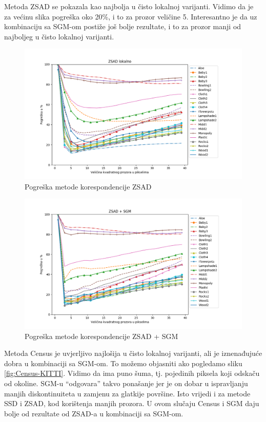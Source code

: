 \documentclass[utf8, zavrsni, numeric]{fer}
\begin{document}
Metoda ZSAD se pokazala kao najbolja u čisto lokalnoj varijanti. Vidimo da je
za većinu slika pogreška oko 20\%, i to za prozor veličine 5. Interesantno je da
uz kombinaciju sa SGM-om postiže još bolje rezultate, i to za prozor manji od
najboljeg u čisto lokalnoj varijanti.

\begin{figure}[H]
  \centering
  \includegraphics[width=13cm]{img/ZSAD_lokalno_middlebury.png}
  \caption{Pogreška metode korespondencije ZSAD}
  \label{fig:ZSAD-error}
\end{figure}

\begin{figure}[H]
  \centering
  \includegraphics[width=13cm]{img/ZSAD_sgm_middlebury.png}
  \caption{Pogreška metode korespondencije ZSAD + SGM}
  \label{fig:ZSAD-sgm-error}
\end{figure}

Metoda Census je uvjerljivo najlošija u čisto lokalnoj varijanti, ali je iznenađujuće dobra
u kombinaciji sa SGM-om. To možemo objasniti ako pogledamo sliku \ref{fig:Census-KITTI}.
Vidimo da ima puno šuma, tj. pojedinih piksela koji odskaču od okoline. SGM-u ``odgovara''
takvo ponašanje jer je on dobar u ispravljanju manjih diskontinuiteta u zamjenu za glatkije
površine. Isto vrijedi i za metode SSD i ZSAD, kod korištenja manjih prozora. U ovom
slučaju Census i SGM daju bolje od rezultate od ZSAD-a u kombinaciji sa SGM-om.
\end{document}
